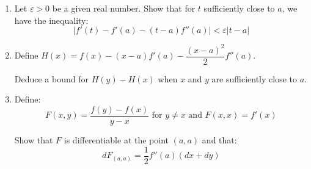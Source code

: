 \documentclass[12pt]{article}
\begin{document}
\begin{enumerate}
    \item Let $\varepsilon > 0$ be a given real number. Show that for $t$ sufficiently close to $a$, we have the inequality:
    $$|f'(t) - f'(a) - (t - a)f''(a)| < \varepsilon|t - a|$$
    
    \item Define $H(x) = f(x) - (x - a)f'(a) - \dfrac{(x - a)^2}{2}f''(a)$.
    
    Deduce a bound for $H(y) - H(x)$ when $x$ and $y$ are sufficiently close to $a$.
    
    \item Define:
    $$F(x, y) = \frac{f(y) - f(x)}{y - x} \text{ for } y \neq x \text{ and } F(x, x) = f'(x)$$
    
    Show that $F$ is differentiable at the point $(a, a)$ and that:
    $$dF_{(a,a)} = \frac{1}{2}f''(a)(dx + dy)$$
\end{enumerate}
\end{document}
